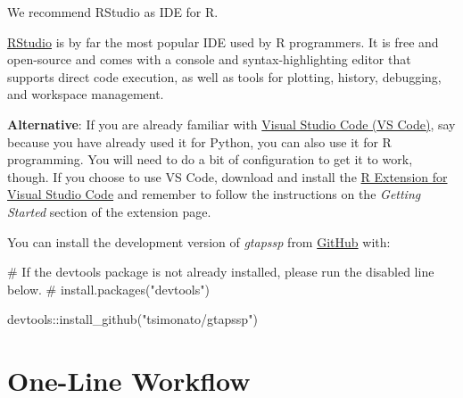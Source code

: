 \documentclass[
  letterpaper,
  DIV=11,
  numbers=noendperiod]{scrartcl}
\newenvironment{Shaded}{}{}
\newcommand{\CommentTok}[1]{\textcolor[rgb]{0.54,0.53,0.53}{#1}}
\newcommand{\FunctionTok}[1]{\textcolor[rgb]{0.39,0.29,0.61}{#1}}
\newcommand{\NormalTok}[1]{\textcolor[rgb]{0.12,0.11,0.11}{#1}}
\newcommand{\SpecialCharTok}[1]{\textcolor[rgb]{0.24,0.68,0.91}{#1}}
\newcommand{\StringTok}[1]{\textcolor[rgb]{0.75,0.01,0.01}{#1}}
\begin{document}
\begin{tcolorbox}[enhanced jigsaw, colback=white, coltitle=black, toprule=.15mm, opacitybacktitle=0.6, title=\textcolor{quarto-callout-tip-color}{\faLightbulb}\hspace{0.5em}{IDE install details}, bottomrule=.15mm, toptitle=1mm, breakable, bottomtitle=1mm, colbacktitle=quarto-callout-tip-color!10!white, opacityback=0, colframe=quarto-callout-tip-color-frame, arc=.35mm, titlerule=0mm, rightrule=.15mm, leftrule=.75mm, left=2mm]

We recommend RStudio as IDE for R.

\href{https://posit.co/download/rstudio-desktop/}{RStudio} is by far the
most popular IDE used by R programmers. It is free and open-source and
comes with a console and syntax-highlighting editor that supports direct
code execution, as well as tools for plotting, history, debugging, and
workspace management.

\textbf{Alternative}: If you are already familiar with
\href{https://code.visualstudio.com/}{Visual Studio Code (VS Code)}, say
because you have already used it for Python, you can also use it for R
programming. You will need to do a bit of configuration to get it to
work, though. If you choose to use VS Code, download and install the
\href{https://marketplace.visualstudio.com/items?itemName=Ikuyadeu.r}{R
Extension for Visual Studio Code} and remember to follow the
instructions on the \emph{Getting Started} section of the extension
page.

\end{tcolorbox}

You can install the development version of \emph{gtapssp} from
\href{https://github.com/tsimonato/gtapssp}{GitHub} with:

\begin{Shaded}
\begin{Highlighting}[]
\CommentTok{\# If the devtools package is not already installed, please run the disabled line below.}
\CommentTok{\# install.packages("devtools")}

\NormalTok{devtools}\SpecialCharTok{::}\FunctionTok{install\_github}\NormalTok{(}\StringTok{"tsimonato/gtapssp"}\NormalTok{)}
\end{Highlighting}
\end{Shaded}

\section{One-Line Workflow}\label{one-line-workflow}
\end{document}
